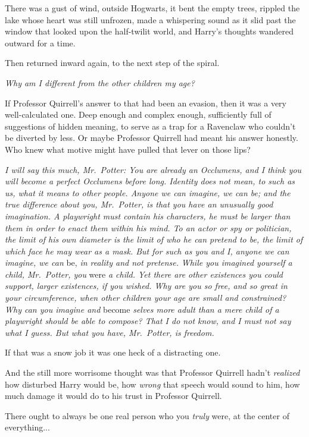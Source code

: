 There was a gust of wind, outside Hogwarts, it bent the empty trees, rippled the lake whose heart was still unfrozen, made a whispering sound as it slid past the window that looked upon the half-twilit world, and Harry’s thoughts wandered outward for a time.

Then returned inward again, to the next step of the spiral.

\emph{Why am I different from the other children my age?}

If Professor Quirrell’s answer to that had been an evasion, then it was a very well-calculated one. Deep enough and complex enough, sufficiently full of suggestions of hidden meaning, to serve as a trap for a Ravenclaw who couldn’t be diverted by less. Or maybe Professor Quirrell had meant his answer honestly. Who knew what motive might have pulled that lever on those lips?

\emph{I will say this much, Mr.~Potter: You are already an Occlumens, and I think you will become a perfect Occlumens before long. Identity does not mean, to such as us, what it means to other people. Anyone we can imagine, we can be; and the true difference about you, Mr.~Potter, is that you have an unusually good imagination. A playwright must contain his characters, he must be larger than them in order to enact them within his mind. To an actor or spy or politician, the limit of his own diameter is the limit of who he can pretend to be, the limit of which face he may wear as a mask. But for such as you and I, anyone we can imagine, we can} be, \emph{in reality and not pretense.} \emph{While you imagined yourself a child, Mr.~Potter, you} were \emph{a child. Yet there are other existences you could support, larger existences, if you wished. Why are you so free, and so great in your circumference, when other children your age are small and constrained? Why can you imagine and} become \emph{selves more adult than a mere child of a playwright should be able to compose? That I do not know, and I must not say what I guess. But what you have, Mr.~Potter, is freedom.}

If that was a snow job it was one heck of a distracting one.

And the still more worrisome thought was that Professor Quirrell hadn’t \emph{realized} how disturbed Harry would be, how \emph{wrong} that speech would sound to him, how much damage it would do to his trust in Professor Quirrell.

There ought to always be one real person who you \emph{truly} were, at the center of everything...

